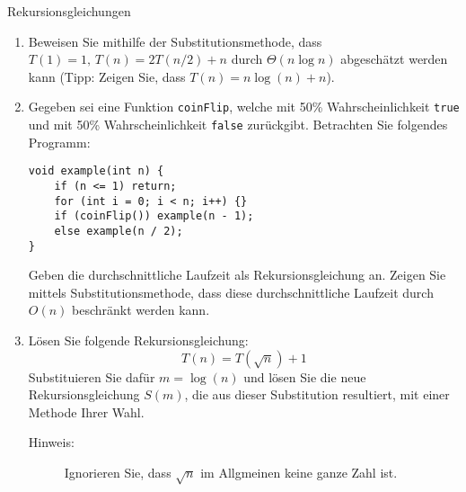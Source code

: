 \documentclass[11pt,a4paper]{article}
\begin{document}
\begin{aufgabe}{1}{Rekursionsgleichungen}
\begin{enumerate}
    \item Beweisen Sie mithilfe der Substitutionsmethode, dass $T(1) = 1, \, T(n) = 2T(n / 2) + n$ durch $\Theta(n \log n)$ abgeschätzt werden kann (Tipp: Zeigen Sie, dass $T(n) = n \log(n) + n$).

    \item Gegeben sei eine Funktion \texttt{coinFlip}, welche mit 50\% Wahrscheinlichkeit \texttt{true} und mit 50\% Wahrscheinlichkeit \texttt{false} zurückgibt. Betrachten Sie folgendes Programm:
    \begin{lstlisting}
void example(int n) {
    if (n <= 1) return;
    for (int i = 0; i < n; i++) {}
    if (coinFlip()) example(n - 1);
    else example(n / 2);
}
    \end{lstlisting}
    Geben die durchschnittliche Laufzeit als Rekursionsgleichung an.
    Zeigen Sie mittels Substitutionsmethode, dass diese durchschnittliche Laufzeit durch $O(n)$ beschränkt werden kann.

    \item
    Lösen Sie folgende Rekursionsgleichung:
    \begin{equation*}
        T(n) = T\left(\sqrt{n}\right) + 1
    \end{equation*}
    Substituieren Sie dafür $m = \log(n)$ und lösen Sie die neue Rekursionsgleichung $S(m)$, die aus dieser Substitution resultiert, mit einer Methode Ihrer Wahl.
    \begin{description}
        \item[Hinweis:] Ignorieren Sie, dass $\sqrt{n}$ im Allgmeinen keine ganze Zahl ist.
    \end{description}
\end{enumerate}
\end{aufgabe}
\end{document}
